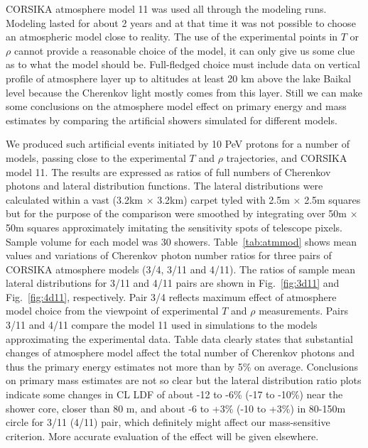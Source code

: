 \documentclass[final,5p,times,twocolumn]{elsarticle}
\begin{document}
CORSIKA atmosphere model 11 was used all through the modeling runs. Modeling lasted for about 2 years and at that time it was not possible to choose an atmospheric model close to reality.
The use of the experimental points in $T$ or $\rho$ cannot provide a reasonable  choice of the model, it can only give us some clue as to what the model should be. Full-fledged choice must
include data on vertical profile of atmosphere layer up to altitudes at least 20 km above the lake Baikal level because the Cherenkov light mostly comes from this layer. Still we can make some
conclusions on the atmosphere model effect on primary energy and mass estimates by comparing the artificial showers simulated for different models.

We produced such artificial events initiated by 10 PeV protons for a number of models,  passing close to the experimental $T$ and $\rho$ trajectories, and CORSIKA model 11. The results are expressed as ratios of full numbers of Cherenkov photons and lateral distribution functions.
The lateral distributions were calculated within a vast (3.2km $\times$ 3.2km) carpet tyled with 2.5m $\times$ 2.5m squares but for the purpose of the comparison were smoothed by integrating over 50m $\times$ 50m squares approximately imitating the sensitivity spots of telescope pixels.
Sample volume for each model was 30 showers. Table~\ref{tab:atmmod} shows mean values and variations of Cherenkov photon number ratios for three pairs of CORSIKA atmosphere models (3/4, 3/11 and 4/11). The ratios of sample mean lateral distributions for 3/11 and 4/11 pairs are shown in Fig.~\ref{fig:3d11} and Fig.~\ref{fig:4d11}, respectively. Pair 3/4 reflects maximum effect of atmosphere model choice from the viewpoint of experimental $T$ and $\rho$ measurements. Pairs 3/11 and 4/11 compare the model 11 used in simulations to the models approximating the experimental data.
Table data clearly states that substantial changes of atmosphere model affect the total number of Cherenkov photons and thus the primary energy estimates not more than by 5\% on average. Conclusions on primary mass estimates are not so clear but the lateral distribution ratio plots indicate some changes in CL LDF of about -12 to -6\% (-17 to -10\%) near the shower core, closer than 80 m, and about -6 to +3\% (-10 to +3\%) in 80-150m circle for 3/11 (4/11) pair, which definitely might affect our mass-sensitive criterion. More accurate evaluation of the effect will be given elsewhere.
\end{document}
